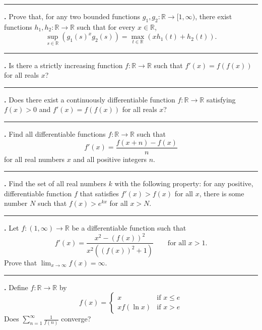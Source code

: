 \documentclass[11pt]{article}
\newcounter{probnum}
\newenvironment{problembox}{\par\noindent\rule{\linewidth}{0.5pt}\vspace{5pt}\par}{\vspace{2pt}}
\begin{document}
\begin{problembox}
\textbf{\theprobnum.} Prove that, for any two bounded functions $g_1, g_2 : \mathbb{R} \to [1,\infty)$, there exist functions $h_1, h_2 : \mathbb{R} \to \mathbb{R}$ such that for every $x \in \mathbb{R}$,
\[
\sup_{s \in \mathbb{R}} \left(g_1(s)^x g_2(s)\right) = \max_{t \in \mathbb{R}} \left(x h_1(t) + h_2(t)\right).
\]
\end{problembox}

\begin{problembox}
\textbf{\theprobnum.} Is there a strictly increasing function $f : \mathbb{R} \to \mathbb{R}$ such that $f'(x) = f(f(x))$ for all reals $x$?
\end{problembox}

\begin{problembox}
\textbf{\theprobnum.} Does there exist a continuously differentiable function $f : \mathbb{R} \to \mathbb{R}$ satisfying $f(x) > 0$ and $f'(x) = f(f(x))$ for all reals $x$?
\end{problembox}

\begin{problembox}
\textbf{\theprobnum.} Find all differentiable functions $f : \mathbb{R} \to \mathbb{R}$ such that
\[
f'(x) = \frac{f(x+n) - f(x)}{n}
\]
for all real numbers $x$ and all positive integers $n$.
\end{problembox}

\begin{problembox}
\textbf{\theprobnum.} Find the set of all real numbers $k$ with the following property: for any positive, differentiable function $f$ that satisfies $f'(x) > f(x)$ for all $x$, there is some number $N$ such that $f(x) > e^{kx}$ for all $x > N$.
\end{problembox}

\begin{problembox}
\textbf{\theprobnum.} Let $f : (1,\infty) \to \mathbb{R}$ be a differentiable function such that
\[
f'(x) = \frac{x^2 - (f(x))^2}{x^2\left((f(x))^2+1\right)} \qquad \text{for all } x > 1.
\]
Prove that $\displaystyle\lim_{x \to \infty} f(x) = \infty$.
\end{problembox}

\begin{problembox}
\textbf{\theprobnum.} Define $f : \mathbb{R} \to \mathbb{R}$ by
\[
f(x) = \begin{cases} x & \text{if } x \le e \\ x f(\ln x) & \text{if } x > e \end{cases}
\]
Does $\displaystyle\sum_{n=1}^{\infty} \frac{1}{f(n)}$ converge?
\end{problembox}
\end{document}
